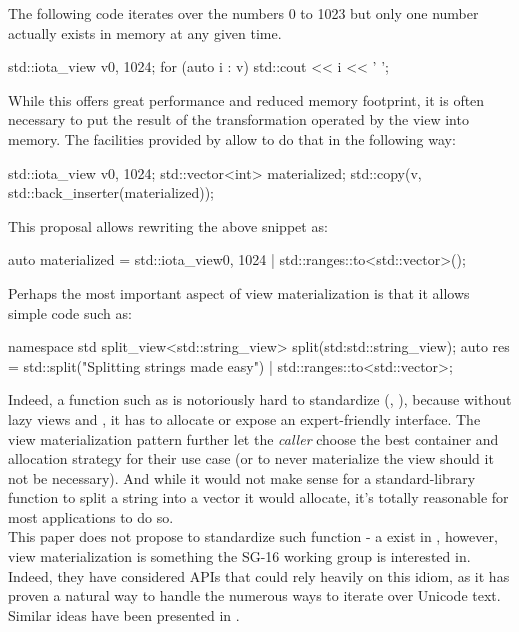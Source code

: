 \documentclass{wg21}
\begin{document}
The following code iterates over the numbers 0 to 1023 but only one number actually exists in memory at any given time.
\begin{colorblock}
std::iota_view v{0, 1024};
for (auto i : v) {
    std::cout << i << ' ';
}
\end{colorblock}

While this offers great performance and reduced memory footprint, it is often necessary to put the result of the transformation operated by the view into memory.
The facilities provided by \cite{P0896R3} allow to do that in the following way:


\begin{colorblock}
    std::iota_view v{0, 1024};
    std::vector<int> materialized;
    std::copy(v, std::back_inserter(materialized));
\end{colorblock}

This proposal allows rewriting the above snippet as:

\begin{colorblock}
    auto materialized = std::iota_view{0, 1024} | std::ranges::to<std::vector>();
\end{colorblock}


Perhaps the most important aspect of view materialization is that it allows simple code such as:

\begin{colorblock}
    namespace std {
        split_view<std::string_view> split(std:std::string_view);
    }
    auto res = std::split("Splitting strings made easy")
    	       | std::ranges::to<std::vector>;
\end{colorblock}

Indeed, a function such as  is notoriously hard to standardize (\cite{P0540},  \cite{N3593}), because without lazy views and , it has to allocate or expose an expert-friendly interface.
The view materialization pattern further let the \emph{caller} choose the best container and allocation strategy for their use case (or to never materialize the view should it not be necessary).
And while it would not make sense for a standard-library function to split a string into a vector it would allocate, it's totally reasonable for most applications to do so.\\

This paper does not propose to standardize such  function - a  exist in \cite{P0896R3}, however, view materialization is something the SG-16 working group is interested in.
Indeed, they have considered APIs that could rely heavily on this idiom, as it has proven a natural way to handle the numerous ways to iterate over Unicode text.
Similar ideas have been presented in \cite{P1004}.
\end{document}
